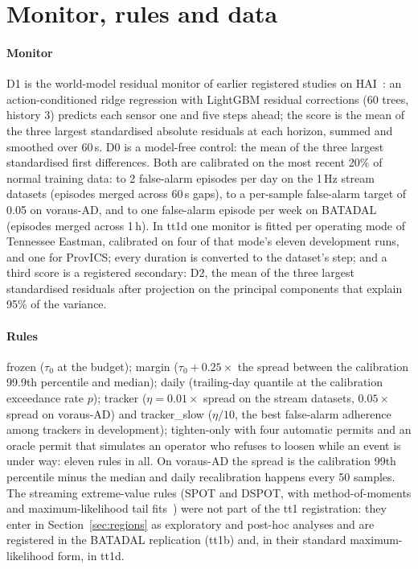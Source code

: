 \documentclass[sigconf]{acmart}
\begin{document}
\section{Monitor, rules and data}
\label{sec:setup}

\paragraph{Monitor}
D1 is the world-model residual monitor of earlier registered studies on HAI~\cite{kulshrestha2026pinp}: an
action-conditioned ridge regression with LightGBM residual corrections (60 trees, history 3)
predicts each sensor one and five steps ahead; the score is the mean of the three largest
standardised absolute residuals at each horizon, summed and smoothed over 60\,s. D0 is a model-free
control: the mean of the three largest standardised first differences. Both are calibrated on the
most recent 20\% of normal training data: to 2 false-alarm episodes per day on the 1\,Hz stream
datasets (episodes merged across 60\,s gaps), to a per-sample false-alarm target of 0.05 on
voraus-AD, and to one false-alarm episode per week on BATADAL (episodes merged across 1\,h). In tt1d
one monitor is fitted per operating mode of Tennessee Eastman, calibrated on four of that mode's eleven
development runs, and one for ProvICS; every duration is converted to the dataset's step; and a third
score is a registered secondary: D2, the mean of the three largest standardised residuals after
projection on the principal components that explain 95\% of the variance.

\paragraph{Rules}
frozen ($\tau_0$ at the budget); margin ($\tau_0 + 0.25 \times$ the spread between the calibration
99.9th percentile and median); daily (trailing-day quantile at the calibration exceedance rate $p$);
tracker ($\eta = 0.01 \times$ spread on the stream datasets, $0.05 \times$ spread on voraus-AD) and
tracker\_slow ($\eta / 10$, the best false-alarm adherence among trackers in development);
tighten-only with four automatic permits and an oracle permit that simulates an operator who refuses
to loosen while an event is under way: eleven rules in all. On voraus-AD the spread is the
calibration 99th percentile minus the median and daily recalibration happens every 50 samples. The
streaming extreme-value rules (SPOT and DSPOT, with method-of-moments and maximum-likelihood tail
fits~\cite{hosking1987gpd, siffer2017spot}) were not part of the tt1 registration: they enter in
Section~\ref{sec:regions} as exploratory and post-hoc analyses and are registered in the BATADAL
replication (tt1b) and, in their standard maximum-likelihood form, in tt1d.
\end{document}
